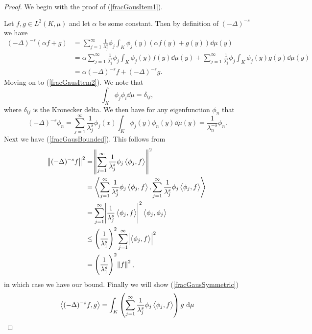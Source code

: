 \begin{proof}
	
	We begin with the proof of (\ref{fracGausItem1}).
	
	\noi Let $f,g \in L^{2}(K, \mu)$ and let $\alpha$ be some constant. Then by definition of $(-\Delta)^{-s}$ we have
	\begin{align}
		(-\Delta)^{-s}(\alpha f + g) &= \sum_{j = 1}^{\infty} \frac{1}{\lambda_{j}^{s}} \phi_j \int_{K} \phi_j(y)(\alpha f(y) + g(y)) \dd \mu(y)\\
		& = \alpha \sum_{j = 1}^{\infty} \frac{1}{\lambda_{j}^{s}} \phi_j \int_{K} \phi_j(y)f(y)  \dd \mu(y) + \sum_{j = 1}^{\infty} \frac{1}{\lambda_{j}^{s}} \phi_j \int_{K} \phi_j(y)g(y) \dd \mu(y) \\
		&=\alpha (-\Delta)^{-s}f + (-\Delta)^{-s}g.
	\end{align}
	 Moving on to (\ref{fracGausItem2}). We note that
	\begin{equation}
		\int_{K}\phi_j \phi_i \dd \mu = \delta_{ij},
	\end{equation}
	where $\delta_{ij}$ is the Kronecker delta. We then have for any eigenfunction $\phi_n$ that
	\begin{equation}
		(-\Delta)^{-s}\phi_n = \sum_{j = 1}^{\infty} \frac{1}{\lambda_{j}^{s}} \phi_j(x) \int_{K}\phi_j(y)\phi_n(y) \dd \mu(y) = \frac{1}{\lambda_{n}^{-s}}\phi_{n}.
	\end{equation}
	Next we have (\ref{fracGausBounded}). This follows from
	\begin{align}
		\norm{(-\Delta)^{-s}f}^2 &= \norm{\sum_{j = 1}^{\infty} \frac{1}{\lambda_{j}^{s}} \phi_j \inn{\phi_j}{f}}^2 \\
			&= \left\langle \sum_{j = 1}^{\infty} \frac{1}{\lambda_{j}^{s}} \phi_j \inn{\phi_j}{f},\sum_{j = 1}^{\infty} \frac{1}{\lambda_{j}^{s}} \phi_j \inn{\phi_j}{f} \right\rangle \\
			&= \sum_{j=1}^{\infty} \abs{\frac{1}{\lambda_j^s} \inn{\phi_j}{f}}^2\inn{\phi_j}{\phi_j} \\
			&\leq \left(\frac{1}{\lambda_1^s}\right)^2 \sum_{j=1}^{\infty} \abs{\inn{\phi_j}{f}}^2 \\
			&= \left(\frac{1}{\lambda_1^s}\right)^2 \norm{f}^2,
	\end{align}
	in which case we have our bound. Finally we will show (\ref{fracGausSymmetric})
	\begin{align}
		\inn{(-\Delta)^{-s}f}{g} &= \int_{K} \left(\sum_{j = 1}^{\infty} \frac{1}{\lambda_{j}^{s}} \phi_j \inn{\phi_j}{f} \right) g \dd \mu \\

\end{align}
\end{proof}
